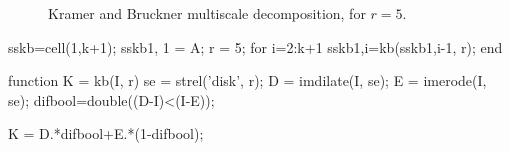 \begin{figure}[htbp]
\centering
 \hfill
 \hfill

 \caption{Kramer and Bruckner multiscale decomposition, for $r=5$.}
 \label{fig:multiscale:matlab:KB}
\end{figure}

\begin{matlab}
sskb=cell(1,k+1);
sskb{1, 1} = A;
r  = 5;
for i=2:k+1
   sskb{1,i}=kb(sskb{1,i-1}, r);
end
\end{matlab}

\begin{matlab}
function K = kb(I, r)
%
se = strel('disk', r);
D = imdilate(I, se);
E = imerode(I, se);
difbool=double((D-I)<(I-E));

K = D.*difbool+E.*(1-difbool); 
\end{matlab}
